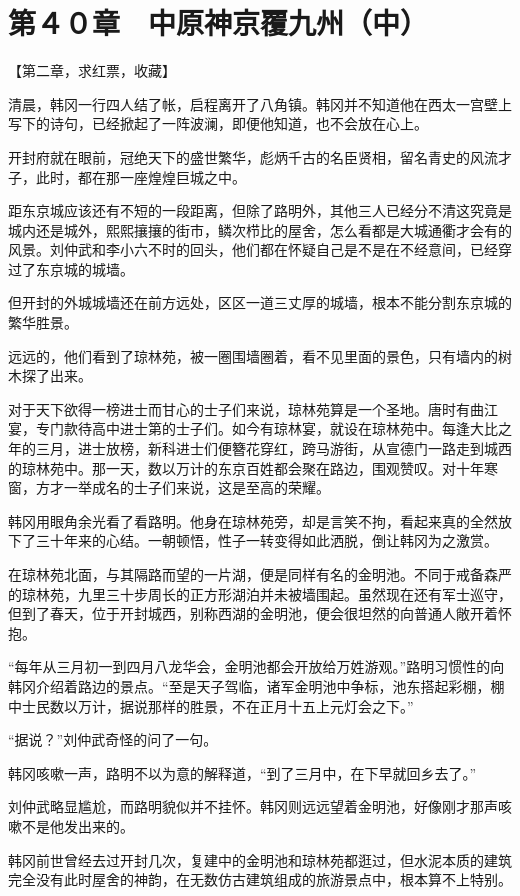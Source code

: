 \section{第４０章　中原神京覆九州（中）}

【第二章，求红票，收藏】

清晨，韩冈一行四人结了帐，启程离开了八角镇。韩冈并不知道他在西太一宫壁上写下的诗句，已经掀起了一阵波澜，即便他知道，也不会放在心上。

开封府就在眼前，冠绝天下的盛世繁华，彪炳千古的名臣贤相，留名青史的风流才子，此时，都在那一座煌煌巨城之中。

距东京城应该还有不短的一段距离，但除了路明外，其他三人已经分不清这究竟是城内还是城外，熙熙攘攘的街市，鳞次栉比的屋舍，怎么看都是大城通衢才会有的风景。刘仲武和李小六不时的回头，他们都在怀疑自己是不是在不经意间，已经穿过了东京城的城墙。

但开封的外城城墙还在前方远处，区区一道三丈厚的城墙，根本不能分割东京城的繁华胜景。

远远的，他们看到了琼林苑，被一圈围墙圈着，看不见里面的景色，只有墙内的树木探了出来。

对于天下欲得一榜进士而甘心的士子们来说，琼林苑算是一个圣地。唐时有曲江宴，专门款待高中进士第的士子们。如今有琼林宴，就设在琼林苑中。每逢大比之年的三月，进士放榜，新科进士们便簪花穿红，跨马游街，从宣德门一路走到城西的琼林苑中。那一天，数以万计的东京百姓都会聚在路边，围观赞叹。对十年寒窗，方才一举成名的士子们来说，这是至高的荣耀。

韩冈用眼角余光看了看路明。他身在琼林苑旁，却是言笑不拘，看起来真的全然放下了三十年来的心结。一朝顿悟，性子一转变得如此洒脱，倒让韩冈为之激赏。

在琼林苑北面，与其隔路而望的一片湖，便是同样有名的金明池。不同于戒备森严的琼林苑，九里三十步周长的正方形湖泊并未被墙围起。虽然现在还有军士巡守，但到了春天，位于开封城西，别称西湖的金明池，便会很坦然的向普通人敞开着怀抱。

“每年从三月初一到四月八龙华会，金明池都会开放给万姓游观。”路明习惯性的向韩冈介绍着路边的景点。“至是天子驾临，诸军金明池中争标，池东搭起彩棚，棚中士民数以万计，据说那样的胜景，不在正月十五上元灯会之下。”

“据说？”刘仲武奇怪的问了一句。

韩冈咳嗽一声，路明不以为意的解释道，“到了三月中，在下早就回乡去了。”

刘仲武略显尴尬，而路明貌似并不挂怀。韩冈则远远望着金明池，好像刚才那声咳嗽不是他发出来的。

韩冈前世曾经去过开封几次，复建中的金明池和琼林苑都逛过，但水泥本质的建筑完全没有此时屋舍的神韵，在无数仿古建筑组成的旅游景点中，根本算不上特别。

